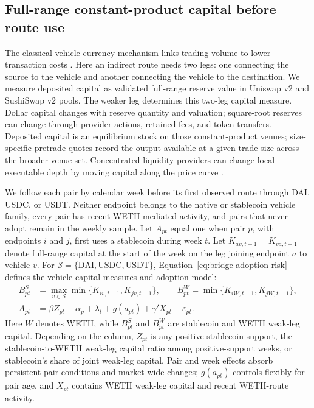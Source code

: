 \subsection{Full-range constant-product capital before route use}
\label{sec:liquidity:capital}

The classical vehicle-currency mechanism links trading volume to lower transaction costs \citep{Krugman1980VehicleCurrencies}. Here an indirect route needs two legs: one connecting the source to the vehicle and another connecting the vehicle to the destination. We measure deposited capital as validated full-range reserve value in Uniswap v2 and SushiSwap v2 pools. The weaker leg determines this two-leg capital measure. Dollar capital changes with reserve quantity and valuation; square-root reserves can change through provider actions, retained fees, and token transfers. Deposited capital is an equilibrium stock on those constant-product venues; size-specific pretrade quotes record the output available at a given trade size across the broader venue set. Concentrated-liquidity providers can change local executable depth by moving capital along the price curve \citep{AdamsZinsmeisterRobinson2021UniswapV3,LeharParlour2024Uniswap}.

We follow each pair by calendar week before its first observed route through DAI, USDC, or USDT. Neither endpoint belongs to the native or stablecoin vehicle family, every pair has recent WETH-mediated activity, and pairs that never adopt remain in the weekly sample. Let \(A_{pt}\) equal one when pair \(p\), with endpoints \(i\) and \(j\), first uses a stablecoin during week \(t\). Let \(K_{av,t-1}=K_{va,t-1}\) denote full-range capital at the start of the week on the leg joining endpoint \(a\) to vehicle \(v\). For \(\mathcal S=\{\mathrm{DAI},\mathrm{USDC},\mathrm{USDT}\}\), Equation~\eqref{eq:bridge-adoption-risk} defines the vehicle capital measures and adoption model:
\begin{equation}
\begin{aligned}
B^S_{pt}&=\max_{v\in\mathcal S}\min\{K_{iv,t-1},K_{jv,t-1}\},\qquad
B^W_{pt}=\min\{K_{iW,t-1},K_{jW,t-1}\},\\
A_{pt}&=\beta Z_{pt}+\alpha_p+\lambda_t+g(a_{pt})+\gamma'X_{pt}+\varepsilon_{pt}.
\end{aligned}
\label{eq:bridge-adoption-risk}
\end{equation}
Here \(W\) denotes WETH, while \(B^S_{pt}\) and \(B^W_{pt}\) are stablecoin and WETH weak-leg capital. Depending on the column, \(Z_{pt}\) is any positive stablecoin support, the stablecoin-to-WETH weak-leg capital ratio among positive-support weeks, or stablecoin's share of joint weak-leg capital. Pair and week effects absorb persistent pair conditions and market-wide changes; \(g(a_{pt})\) controls flexibly for pair age, and \(X_{pt}\) contains WETH weak-leg capital and recent WETH-route activity.


